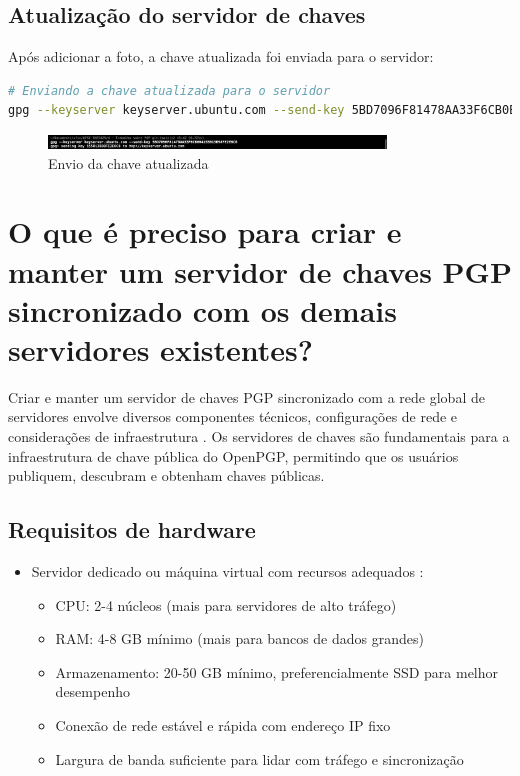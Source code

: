 \subsection{Atualização do servidor de chaves}
Após adicionar a foto, a chave atualizada foi enviada para o servidor:

\begin{lstlisting}[language=bash]
# Enviando a chave atualizada para o servidor
gpg --keyserver keyserver.ubuntu.com --send-key 5BD7096F81478AA33F6CB0B4155B13B98FE2E6C8
\end{lstlisting}

\begin{figure}[htb]
    \centering
    \includegraphics[width=0.8\textwidth]{images/08-envio_chave_atualizada.jpg}
    \caption{Envio da chave atualizada}
    \label{fig:envio-chave-atualizada}
\end{figure}

\section{O que é preciso para criar e manter um servidor de chaves PGP sincronizado com os demais servidores existentes?}

Criar e manter um servidor de chaves PGP sincronizado com a rede global de servidores envolve diversos componentes técnicos, configurações de rede e considerações de infraestrutura \cite{koch2018keyserver}. Os servidores de chaves são fundamentais para a infraestrutura de chave pública do OpenPGP, permitindo que os usuários publiquem, descubram e obtenham chaves públicas.

\subsection{Requisitos de hardware}
\begin{itemize}
    \item Servidor dedicado ou máquina virtual com recursos adequados \cite{sksdoc}:
    \begin{itemize}
        \item CPU: 2-4 núcleos (mais para servidores de alto tráfego)
        \item RAM: 4-8 GB mínimo (mais para bancos de dados grandes)
        \item Armazenamento: 20-50 GB mínimo, preferencialmente SSD para melhor desempenho
        \item Conexão de rede estável e rápida com endereço IP fixo
        \item Largura de banda suficiente para lidar com tráfego e sincronização
    \end{itemize}
\end{itemize}

